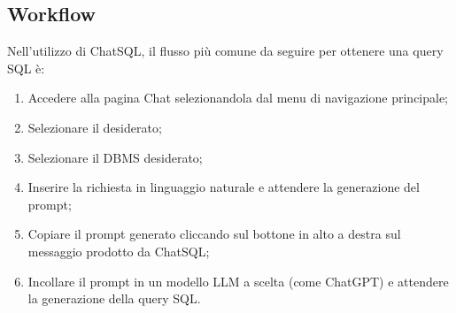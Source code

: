 \subsection{Workflow}
\par Nell'utilizzo di ChatSQL, il flusso più comune da seguire per ottenere una query SQL è:
\begin{enumerate}
  \item Accedere alla pagina Chat selezionandola dal menu di navigazione principale;
  \item Selezionare il  desiderato;
  \item Selezionare il DBMS desiderato;
  \item Inserire la richiesta in linguaggio naturale e attendere la generazione del prompt;
  \item Copiare il prompt generato cliccando sul bottone in alto a destra sul messaggio prodotto da ChatSQL;
  \item Incollare il prompt in un modello LLM a scelta (come ChatGPT) e attendere la generazione della query SQL.
\end{enumerate}
